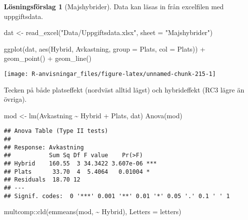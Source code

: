 \documentclass[
]{book}
\newenvironment{Shaded}{\begin{snugshade}}{\end{snugshade}}
\newcommand{\AttributeTok}[1]{\textcolor[rgb]{0.77,0.63,0.00}{#1}}
\newcommand{\FunctionTok}[1]{\textcolor[rgb]{0.00,0.00,0.00}{#1}}
\newcommand{\NormalTok}[1]{#1}
\newcommand{\OtherTok}[1]{\textcolor[rgb]{0.56,0.35,0.01}{#1}}
\newcommand{\SpecialCharTok}[1]{\textcolor[rgb]{0.00,0.00,0.00}{#1}}
\newcommand{\StringTok}[1]{\textcolor[rgb]{0.31,0.60,0.02}{#1}}
\theoremstyle{definition}
\theoremstyle{definition}
\theoremstyle{definition}
\theoremstyle{definition}
\newtheorem{hypothesis}{Lösningsförslag}[chapter]
\theoremstyle{remark}
\begin{document}
\begin{hypothesis}[Majshybrider]
Data kan läsas in från excelfilen med uppgiftsdata.

\begin{Shaded}
\begin{Highlighting}[]
\NormalTok{dat }\OtherTok{\textless{}{-}} \FunctionTok{read\_excel}\NormalTok{(}\StringTok{"Data/Uppgiftsdata.xlsx"}\NormalTok{, }\AttributeTok{sheet =} \StringTok{"Majshybrider"}\NormalTok{)}

\FunctionTok{ggplot}\NormalTok{(dat, }\FunctionTok{aes}\NormalTok{(Hybrid, Avkastning, }\AttributeTok{group =}\NormalTok{ Plats, }\AttributeTok{col =}\NormalTok{ Plats)) }\SpecialCharTok{+}
  \FunctionTok{geom\_point}\NormalTok{() }\SpecialCharTok{+}
  \FunctionTok{geom\_line}\NormalTok{()}
\end{Highlighting}
\end{Shaded}

\begin{center}\texttt{[image: R-anvisningar\_files/figure-latex/unnamed-chunk-215-1]} \end{center}

Tecken på både platseffekt (nordväst alltid lägst) och hybrideffekt (RC3 lägre än övriga).

\begin{Shaded}
\begin{Highlighting}[]
\NormalTok{mod }\OtherTok{\textless{}{-}} \FunctionTok{lm}\NormalTok{(Avkastning }\SpecialCharTok{\textasciitilde{}}\NormalTok{ Hybrid }\SpecialCharTok{+}\NormalTok{ Plats, dat)}
\FunctionTok{Anova}\NormalTok{(mod)}
\end{Highlighting}
\end{Shaded}

\begin{verbatim}
## Anova Table (Type II tests)
## 
## Response: Avkastning
##           Sum Sq Df F value    Pr(>F)    
## Hybrid    160.55  3 34.3422 3.607e-06 ***
## Plats      33.70  4  5.4064   0.01004 *  
## Residuals  18.70 12                      
## ---
## Signif. codes:  0 '***' 0.001 '**' 0.01 '*' 0.05 '.' 0.1 ' ' 1
\end{verbatim}

\begin{Shaded}
\begin{Highlighting}[]
\NormalTok{multcomp}\SpecialCharTok{::}\FunctionTok{cld}\NormalTok{(}\FunctionTok{emmeans}\NormalTok{(mod, }\SpecialCharTok{\textasciitilde{}}\NormalTok{ Hybrid), }\AttributeTok{Letters =}\NormalTok{ letters)}
\end{Highlighting}
\end{Shaded}


\end{hypothesis}
\end{document}
